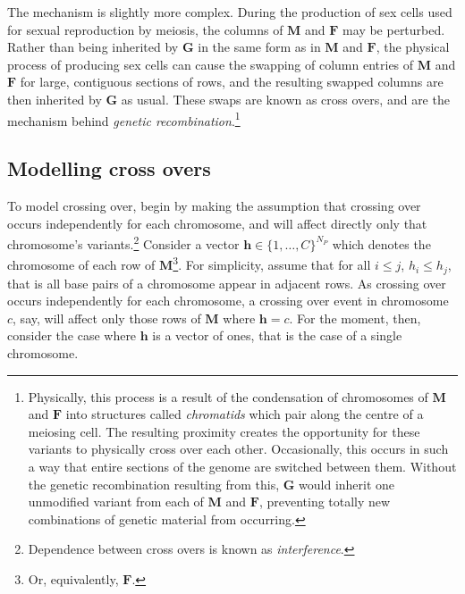 \documentclass{article}
\newcommand{\ve}[1]{\mathbf{#1}}           %
\newcommand{\m}[1]{\mathbf{#1}}               %
\begin{document}
The mechanism is slightly more complex. During the production of sex cells used for sexual reproduction by meiosis, the columns of $\m{M}$ and $\m{F}$ may be perturbed. Rather than being inherited by $\m{G}$ in the same form as in $\m{M}$ and $\m{F}$, the physical process of producing sex cells can cause the swapping of column entries of $\m{M}$ and $\m{F}$ for large, contiguous sections of rows, and the resulting swapped columns are then inherited by $\m{G}$ as usual. These swaps are known as cross overs, and are the mechanism behind \textit{genetic recombination}.\footnote{Physically, this process is a result of the condensation of chromosomes of $\m{M}$ and $\m{F}$ into structures called \textit{chromatids} which pair along the centre of a meiosing cell. The resulting proximity creates the opportunity for these variants to physically cross over each other. Occasionally, this occurs in such a way that entire sections of the genome are switched between them. Without the genetic recombination resulting from this, $\m{G}$ would inherit one unmodified variant from each of $\m{M}$ and $\m{F}$, preventing totally new combinations of genetic material from occurring.}

\subsection{Modelling cross overs} \label{subsec:modelcrossing}

To model crossing over, begin by making the assumption that crossing over occurs independently for each chromosome, and will affect directly only that chromosome's variants.\footnote{Dependence between cross overs is known as \textit{interference}.} Consider a vector $\ve{h} \in \{1, \dots, C\}^{N_P}$ which denotes the chromosome of each row of $\m{M}$\footnote{Or, equivalently, $\m{F}$.}. For simplicity, assume that for all $i \leq j$, $h_i \leq h_j$, that is all base pairs of a chromosome appear in adjacent rows. As crossing over occurs independently for each chromosome, a crossing over event in chromosome $c$, say, will affect only those rows of $\m{M}$ where $\ve{h} = c$. For the moment, then, consider the case where $\ve{h}$ is a vector of ones, that is the case of a single chromosome.
\end{document}
